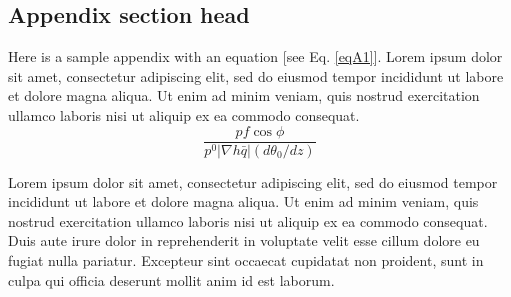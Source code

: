 \documentclass{ametsocv6.1}
\begin{document}
\appendix[A]

\subsection*{Appendix section head}

Here is a sample appendix with an equation [see Eq. \eqref{eqA1}]. Lorem ipsum dolor sit amet, consectetur adipiscing elit, sed do eiusmod tempor incididunt ut labore et dolore magna aliqua. Ut enim ad minim veniam, quis nostrud exercitation ullamco laboris nisi ut aliquip ex ea commodo consequat.
\begin{equation}
\frac{
pf \cos\phi}
{p^0|\nabla h\bar q|(d\theta_0/dz)}\label{eqA1}
\end{equation}

Lorem ipsum dolor sit amet, consectetur adipiscing elit, sed do eiusmod tempor incididunt ut labore et dolore magna aliqua. Ut enim ad minim veniam, quis nostrud exercitation ullamco laboris nisi ut aliquip ex ea commodo consequat. Duis aute irure dolor in reprehenderit in voluptate velit esse cillum dolore eu fugiat nulla pariatur. Excepteur sint occaecat cupidatat non proident, sunt in culpa qui officia deserunt mollit anim id est laborum.
\end{document}
